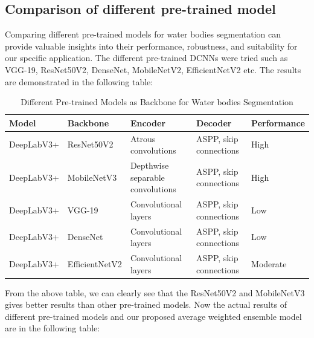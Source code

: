 \subsection{Comparison of different pre-trained model}
Comparing different pre-trained models for water bodies segmentation can provide valuable insights into their performance, robustness, and suitability for our specific application.
The different pre-trained DCNNs were tried such as VGG-19, ResNet50V2, DenseNet, MobileNetV2, EfficientNetV2 etc. The results are demonstrated in the following table:
\\


\begin{table}[htbp]
\centering
\captionsetup{font=small} %
\caption{Different Pre-trained Models as Backbone for Water bodies Segmentation}
\label{tab:pretrained-models}
\normalsize %
\begin{tabular}{|p{2cm}|p{2.5cm}|p{2.5cm}|p{3.1cm}|p{2.2cm}|} %
\hline
\textbf{Model} & \textbf{Backbone} & \textbf{Encoder} & \textbf{Decoder} & \textbf{Performance} \\ \hline
DeepLabV3+ & ResNet50V2 & Atrous convolutions & ASPP, skip connections & High \\ \hline
DeepLabV3+ & MobileNetV3 & Depthwise separable convolutions & ASPP, skip connections & High \\ \hline
DeepLabV3+ & VGG-19 & Convolutional layers & ASPP, skip connections & Low \\ \hline
DeepLabV3+ & DenseNet & Convolutional layers & ASPP, skip connections & Low \\ \hline
DeepLabV3+ & EfficientNetV2 & Convolutional layers & ASPP, skip connections & Moderate \\ \hline
\end{tabular}
\end{table}

From the above table, we can clearly see that the ResNet50V2 and MobileNetV3 gives better results than other pre-trained models. Now the actual results of different pre-trained models and our proposed average weighted ensemble model are in the following table: 



